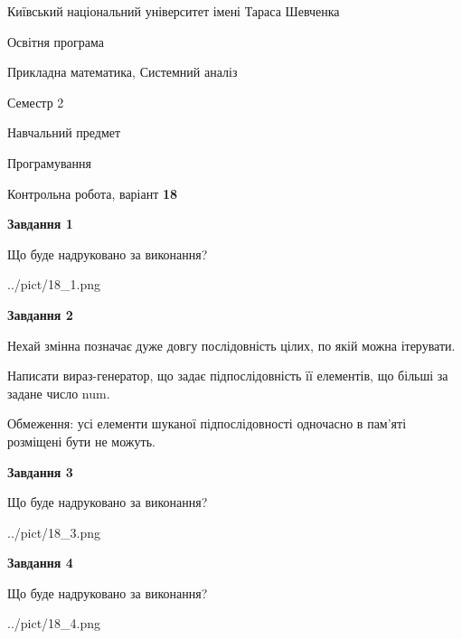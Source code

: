 \documentclass[12pt, ukrainian]{article}
\begin{document}
{{\begin {small}\par
{ \center  Київський національний університет імені Тараса Шевченка \par}
{\parbox {5 cm}{Освітня програма \hfill}{\parbox {8 cm}{Прикладна математика, Системний аналіз \hfill}}\parbox {5 cm}{\hfill Семестр 2}}\par
{\parbox {5 cm} {Навчальний предмет \hfill}\parbox {7 cm}{Програмування \hfill}\parbox {6cm}{\hfill}\par}\vspace{-7pt} \end{small}}{\center Контрольна робота, варіант  \No \textbf
{ 18 }\par}}
{
\begin {large}
{\begin {center}\textbf{Завдання 1}\end {center}}\par
Що буде надруковано за виконання?\par\par
\begin{center}
	{../pict/18_1.png}
\end{center}
\newpage

{\begin {center}\textbf{Завдання 2}\end {center}}\par
Нехай змінна  позначає дуже довгу послідовність цілих, по якій можна ітерувати.

Написати вираз-генератор, що задає підпослідовність її елементів, що більші за задане число num.

Обмеження: усі елементи шуканої підпослідовності одночасно в пам'яті розміщені бути не можуть.\par
\newpage

{\begin {center}\textbf{Завдання 3}\end {center}}\par
Що буде надруковано за виконання?\par
\begin{center}
	{../pict/18_3.png}
\end{center}
\newpage

{\begin {center}\textbf{Завдання 4}\end {center}}\par
Що буде надруковано за виконання?\par
\begin{center}
	{../pict/18_4.png}
\end{center}
\newpage


\end{large}}
\end{document}
